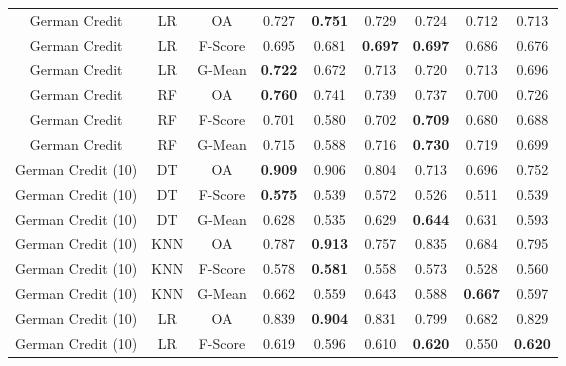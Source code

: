 \begin{longtable}{ccccccccc}
     German Credit &         LR &      OA &          0.727 & \textbf{0.751} &          0.729 &          0.724 &          0.712 &          0.713 \\
     German Credit &         LR & F-Score &          0.695 &          0.681 & \textbf{0.697} & \textbf{0.697} &          0.686 &          0.676 \\
     German Credit &         LR &  G-Mean & \textbf{0.722} &          0.672 &          0.713 &          0.720 &          0.713 &          0.696 \\
     German Credit &         RF &      OA & \textbf{0.760} &          0.741 &          0.739 &          0.737 &          0.700 &          0.726 \\
     German Credit &         RF & F-Score &          0.701 &          0.580 &          0.702 & \textbf{0.709} &          0.680 &          0.688 \\
     German Credit &         RF &  G-Mean &          0.715 &          0.588 &          0.716 & \textbf{0.730} &          0.719 &          0.699 \\
German Credit (10) &         DT &      OA & \textbf{0.909} &          0.906 &          0.804 &          0.713 &          0.696 &          0.752 \\
German Credit (10) &         DT & F-Score & \textbf{0.575} &          0.539 &          0.572 &          0.526 &          0.511 &          0.539 \\
German Credit (10) &         DT &  G-Mean &          0.628 &          0.535 &          0.629 & \textbf{0.644} &          0.631 &          0.593 \\
German Credit (10) &        KNN &      OA &          0.787 & \textbf{0.913} &          0.757 &          0.835 &          0.684 &          0.795 \\
German Credit (10) &        KNN & F-Score &          0.578 & \textbf{0.581} &          0.558 &          0.573 &          0.528 &          0.560 \\
German Credit (10) &        KNN &  G-Mean &          0.662 &          0.559 &          0.643 &          0.588 & \textbf{0.667} &          0.597 \\
German Credit (10) &         LR &      OA &          0.839 & \textbf{0.904} &          0.831 &          0.799 &          0.682 &          0.829 \\
German Credit (10) &         LR & F-Score &          0.619 &          0.596 &          0.610 & \textbf{0.620} &          0.550 & \textbf{0.620} \\

\end{longtable}
